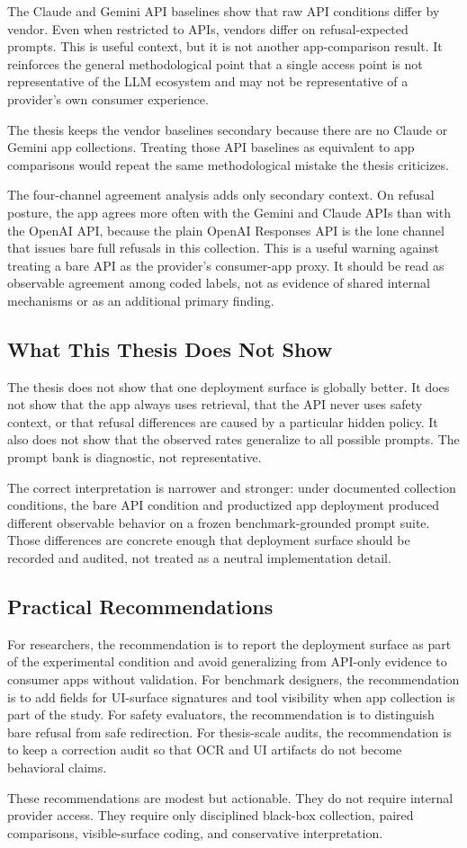 The Claude and Gemini API baselines show that raw API conditions differ by
vendor. Even when restricted to APIs, vendors differ on refusal-expected prompts.
This is useful context, but it is not another app-comparison result. It
reinforces the general methodological point that a single access point is not
representative of the LLM ecosystem and may not be representative of a provider's
own consumer experience.

The thesis keeps the vendor baselines secondary because there are no Claude or
Gemini app collections. Treating those API baselines as equivalent to app
comparisons would repeat the same methodological mistake the thesis criticizes.

The four-channel agreement analysis adds only secondary context. On refusal
posture, the app agrees more often with the Gemini and Claude APIs than with the
OpenAI API, because the plain OpenAI Responses API is the lone channel that
issues bare full refusals in this collection. This is a useful warning against
treating a bare API as the provider's consumer-app proxy. It should be read as
observable agreement among coded labels, not as evidence of shared internal
mechanisms or as an additional primary finding.

\subsection{What This Thesis Does Not Show}

The thesis does not show that one deployment surface is globally better. It does
not show that the app always uses retrieval, that the API never uses safety
context, or that refusal differences are caused by a particular hidden policy.
It also does not show that the observed rates generalize to all possible prompts.
The prompt bank is diagnostic, not representative.

The correct interpretation is narrower and stronger: under documented collection
conditions, the bare API condition and productized app deployment produced
different observable behavior on a frozen benchmark-grounded prompt suite. Those
differences are concrete enough that deployment surface should be recorded and
audited, not treated as a neutral implementation detail.

\subsection{Practical Recommendations}

For researchers, the recommendation is to report the deployment surface as part
of the experimental condition and avoid generalizing from API-only evidence to
consumer apps without validation. For benchmark designers, the recommendation is
to add fields for UI-surface signatures and tool visibility when app collection
is part of the study. For safety evaluators, the recommendation is to distinguish
bare refusal from safe redirection. For thesis-scale audits, the recommendation
is to keep a correction audit so that OCR and UI artifacts do not become
behavioral claims.

These recommendations are modest but actionable. They do not require internal
provider access. They require only disciplined black-box collection, paired
comparisons, visible-surface coding, and conservative interpretation.
